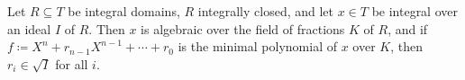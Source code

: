 Let $R \subseteq T$ be integral domains, $R$ integrally closed, and let
$x \in T$ be integral over an ideal $I$ of $R$. Then $x$ is algebraic over the
field of fractions $K$ of $R$, and if $f\coloneqq X^n + r_{n-1}X^{n-1} + \cdots + r_0$ is
the minimal polynomial of $x$ over $K$, then $r_i \in \sqrt{I}$ for all $i$.
